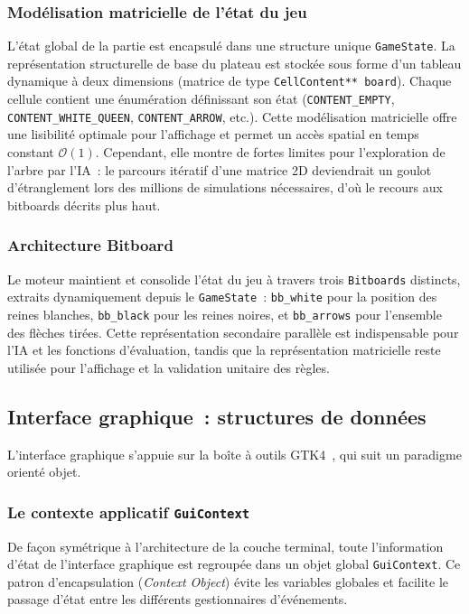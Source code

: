 \documentclass[a4paper]{article}
\begin{document}
\subsubsection{Modélisation matricielle de l'état du jeu}

L'état global de la partie est encapsulé dans une structure unique
\texttt{GameState}. La représentation structurelle de base du plateau est
stockée sous forme d'un tableau dynamique à deux dimensions (matrice de type
\texttt{CellContent** board}). Chaque cellule contient une énumération
définissant son état (\texttt{CONTENT\_EMPTY}, \texttt{CONTENT\_WHITE\_QUEEN},
\texttt{CONTENT\_ARROW}, etc.). Cette modélisation matricielle offre une
lisibilité optimale pour l'affichage et permet un accès spatial en temps
constant $\mathcal{O}(1)$. Cependant, elle montre de fortes limites pour
l'exploration de l'arbre par l'IA~: le parcours itératif d'une matrice 2D
deviendrait un goulot d'étranglement lors des millions de simulations
nécessaires, d'où le recours aux bitboards décrits plus haut.

\subsubsection{Architecture Bitboard}

Le moteur maintient et consolide l'état du jeu à travers trois
\texttt{Bitboards} distincts, extraits dynamiquement depuis le
\texttt{GameState}~: \texttt{bb\_white} pour la position des reines blanches,
\texttt{bb\_black} pour les reines noires, et \texttt{bb\_arrows} pour
l'ensemble des flèches tirées. Cette représentation secondaire parallèle est
indispensable pour l'IA et les fonctions d'évaluation, tandis que la
représentation matricielle reste utilisée pour l'affichage et la validation
unitaire des règles.

\subsection{Interface graphique~: structures de données}
\label{sec:gui-data}

L'interface graphique s'appuie sur la boîte à outils GTK4~\cite{gtk4doc},
qui suit un paradigme orienté objet.

\subsubsection{Le contexte applicatif \texttt{GuiContext}}

De façon symétrique à l'architecture de la couche terminal, toute
l'information d'état de l'interface graphique est regroupée dans un objet global
\texttt{GuiContext}. Ce patron d'encapsulation (\textit{Context Object}) évite les variables
globales et facilite le passage d'état entre les différents gestionnaires
d'événements. 
\end{document}
